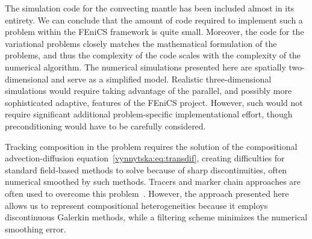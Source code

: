 The simulation code for the convecting mantle has been included almost
in its entirety. We can conclude that the amount of code required
to implement such a problem within the FEniCS framework is quite
small. Moreover, the code for the variational problems closely matches
the mathematical formulation of the problems, and thus the complexity
of the code scales with the complexity of the numerical algorithm.
The numerical simulations presented here are spatially two-dimensional and
serve as a simplified model. Realistic three-dimensional simulations would
require taking advantage of the parallel, and possibly more sophisticated
adaptive, features of the FEniCS project. However, such would not require
significant additional problem-specific implementational effort, though
preconditioning would have to be carefully considered.

Tracking composition in the problem requires the solution of the
compositional advection-diffusion equation~\eqref{vynnytska:eq:transdif},
creating difficulties for standard field-based methods to solve because
of sharp discontinuities, often numerical smoothed by such methods.
Tracers and marker chain approaches are often used to overcome this
problem~\citep{IsmailZadehTackley2010}. However, the approach presented
here allows us to represent compositional heterogeneities because
it employs discontinuous Galerkin methods, while a filtering scheme
minimizes the numerical smoothing error.

